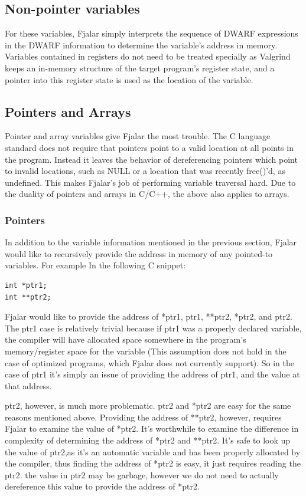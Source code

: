 \documentclass{article}
\begin{document}
\subsection{Non-pointer variables}
For these variables, Fjalar simply interprets the sequence of DWARF
expressions in the DWARF information to determine the variable's
address in memory. Variables contained in registers do not need to be treated
specially as Valgrind keeps an in-memory structure of the target
program's register state, and a pointer into this register state is
used as the location of the variable.

\subsection{Pointers and Arrays}
Pointer and array variables give Fjalar the most trouble. The C
language standard does not require that pointers point to a valid
location at all points in the program. Instead it leaves the behavior
of dereferencing pointers which point to invalid locations, such as
NULL or a location that was recently free()'d, as
undefined. This makes Fjalar's job of performing variable traversal
hard. Due to the duality of pointers and arrays in C/C++, the above
also applies to arrays.

\subsubsection{Pointers}
In addition to the variable information mentioned in the previous
section, Fjalar would like to recursively provide the
address in memory of any pointed-to variables. For example In the
following C snippet:

\lstset{language=C, frame=single,}
\begin{lstlisting}
int *ptr1;
int **ptr2;
\end{lstlisting}

Fjalar would like to provide the address of *ptr1, ptr1, **ptr2,
*ptr2, and ptr2. The ptr1 case is relatively trivial because if ptr1
was a properly declared variable, the compiler will have allocated
space somewhere in the program's memory/register space for the
variable (This assumption does not hold in the case of optimized
programs, which Fjalar does not currently support). So in the case of
ptr1 it's simply an issue of providing the address of ptr1, and the
value at that address.

ptr2, however, is much more problematic. ptr2 and *ptr2 are easy for
the same reasons mentioned above. Providing the address of **ptr2,
however, requires Fjalar to examine the  value of *ptr2. It's worthwhile to examine the
difference in complexity of determining the address of *ptr2 and
**ptr2. It's safe to look up the value of ptr2,as it's an automatic variable and has been properly
allocated by the compiler, thus finding the address of *ptr2 is easy,
it just requires reading the ptr2. the value
in ptr2 may be garbage, however we do not need to actually
dereference this value to provide the address of *ptr2.
\end{document}
